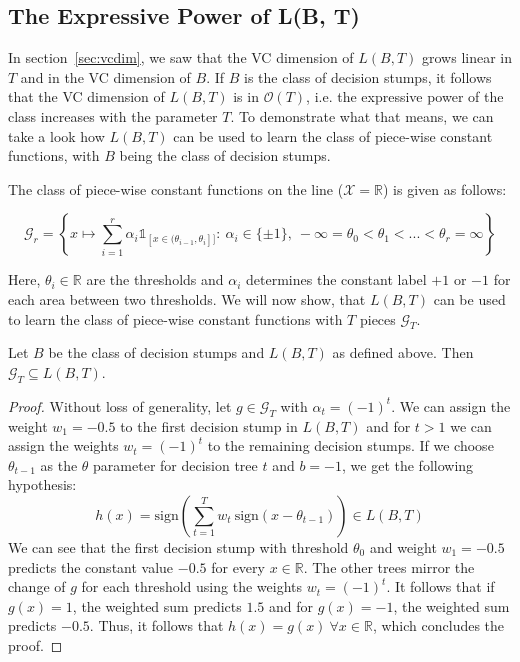 \subsection{The Expressive Power of L(B, T)}

In section~\ref{sec:vcdim}, we saw that the VC dimension of $L(B, T)$ grows linear in $T$ and in the VC dimension of
$B$. If $B$ is the class of decision stumps, it follows that the VC dimension
of $L(B, T)$ is in $\mathcal{O}(T)$, i.e. the expressive power of the class increases with the parameter $T$.
To demonstrate what that means, we can take a look how $L(B, T)$ can be used to learn the class of piece-wise constant
functions, with $B$ being the class of decision stumps.

The class of piece-wise constant functions on the line ($\mathcal{X} = \mathbb{R}$) is given as follows:
\begin{linenomath*}
    $$
    \mathcal{G}_r = \left \{ x \mapsto \sum_{i=1}^r \alpha_i \mathds{1}_{[x \in (\theta_{i-1}, \theta_i]]}: \ 
        \alpha_i \in \{\pm 1 \},\  -\infty = \theta_0 < \theta_1 < ... < \theta_r = \infty \right \}
    $$
\end{linenomath*}
Here, $\theta_i \in \mathbb{R}$ are the thresholds and $\alpha_i$ determines the constant label $+1$ or $-1$
for each area between two thresholds. We will now show, that $L(B, T)$ can be used to learn the class
of piece-wise constant functions with $T$ pieces $\mathcal{G}_T$.

\begin{theorem}
\label{thm:piece-wise}
\begin{linenomath*}
	Let $B$ be the class of decision stumps and $L(B, T)$ as defined above.
	Then $\mathcal{G}_T \subseteq L(B, T)$.
\end{linenomath*}
\end{theorem}
\begin{proof}
	Without loss of generality, let $g \in \mathcal{G}_T$ with $\alpha_t = (-1)^t$. We can assign the weight
	$w_1=-0.5$ to the first decision stump in $L(B, T)$ and for $t > 1$ we can assign the weights $w_t = (-1)^t$
	to the remaining decision stumps. If we choose $\theta_{t-1}$ as the $\theta$ parameter for decision
	tree $t$ and $b=-1$, we get the following hypothesis:
	$$
	    h(x) = \text{sign} \left( \sum_{t=1}^T w_t \  \text{sign} (x - \theta_{t-1}) \right) \in L(B, T)
	$$
	We can see that the first decision stump with threshold $\theta_{0}$ and weight $w_1 = -0.5$ predicts the
	constant value $-0.5$ for every $x \in \mathbb{R}$. The other trees mirror the change of $g$ for each threshold
	using the weights $w_t = (-1)^t$. It follows that if $g(x) = 1$, the weighted sum predicts $1.5$ and for
	$g(x) = -1$, the weighted sum predicts $-0.5$. Thus, it follows that $h(x) = g(x)\  \forall x \in \mathbb{R}$,
	which concludes the proof.
\end{proof}